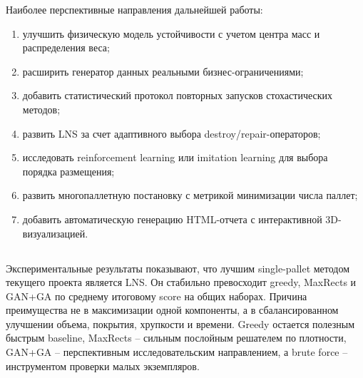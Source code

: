 Наиболее перспективные направления дальнейшей работы:
\begin{enumerate}
  \item улучшить физическую модель устойчивости с учетом центра масс и распределения веса;
  \item расширить генератор данных реальными бизнес-ограничениями;
  \item добавить статистический протокол повторных запусков стохастических методов;
  \item развить LNS за счет адаптивного выбора destroy/repair-операторов;
  \item исследовать reinforcement learning или imitation learning для выбора порядка размещения;
  \item развить многопаллетную постановку с метрикой минимизации числа паллет;
  \item добавить автоматическую генерацию HTML-отчета с интерактивной 3D-визуализацией.
\end{enumerate}

\subsection{}

Экспериментальные результаты показывают, что лучшим single-pallet методом текущего проекта является LNS. Он стабильно превосходит greedy, MaxRects и GAN+GA по среднему итоговому score на общих наборах. Причина преимущества не в максимизации одной компоненты, а в сбалансированном улучшении объема, покрытия, хрупкости и времени. Greedy остается полезным быстрым baseline, MaxRects -- сильным послойным решателем по плотности, GAN+GA -- перспективным исследовательским направлением, а brute force -- инструментом проверки малых экземпляров.
